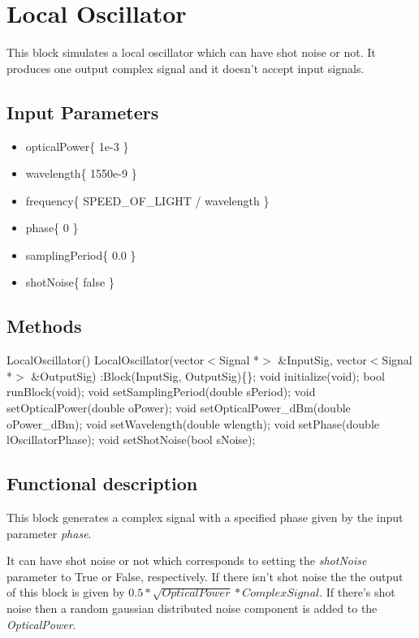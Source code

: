 \clearpage

\section{Local Oscillator}

This block simulates a local oscillator which can have shot noise or not. It produces one output complex signal and it doesn't accept input signals.

\subsection*{Input Parameters}

\begin{itemize}
	\item opticalPower\{ 1e-3 \}
	\item wavelength\{ 1550e-9 \}
	\item frequency\{ SPEED\_OF\_LIGHT / wavelength \}
	\item phase\{ 0 \}
	\item samplingPeriod\{ 0.0 \}
	\item shotNoise\{ false \}
\end{itemize}

\subsection*{Methods}

LocalOscillator() {}
\bigbreak
LocalOscillator(vector$<$Signal *$>$ \&InputSig, vector$<$Signal *$>$ \&OutputSig) :Block(InputSig, OutputSig)\{\};
\bigbreak
void initialize(void);
\bigbreak
bool runBlock(void);
\bigbreak
void setSamplingPeriod(double sPeriod);
\bigbreak
void setOpticalPower(double oPower);
\bigbreak
void setOpticalPower\_dBm(double oPower\_dBm);
\bigbreak
void setWavelength(double wlength);
\bigbreak
void setPhase(double lOscillatorPhase);
\bigbreak
void setShotNoise(bool sNoise);

\subsection*{Functional description}

This block generates a complex signal with a specified phase given by the input parameter \textit{phase}.

It can have shot noise or not which corresponds to setting the \textit{shotNoise} parameter to True or False, respectively. If there isn't shot noise the the output of this block is given by $0.5*\sqrt{OpticalPower}*ComplexSignal$. If there's shot noise then a random gaussian distributed noise component is added to the \textit{OpticalPower}.

